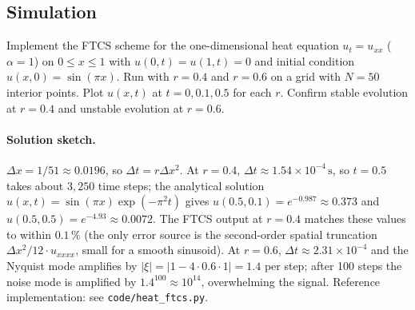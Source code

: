\subsection*{Simulation}

\begin{exercise}
Implement the FTCS scheme for the one-dimensional heat equation
$u_{t} = u_{xx}$ ($\alpha = 1$) on $0 \leq x \leq 1$ with
$u(0, t) = u(1, t) = 0$ and initial condition $u(x, 0) = \sin(\pi
x)$. Run with $r = 0.4$ and $r = 0.6$ on a grid with $N = 50$
interior points. Plot $u(x, t)$ at $t = 0, 0.1, 0.5$ for each
$r$. Confirm stable evolution at $r = 0.4$ and unstable evolution
at $r = 0.6$.

\paragraph{Solution sketch.}
$\Delta x = 1/51 \approx 0.0196$, so $\Delta t = r \Delta x^{2}$.
At $r = 0.4$, $\Delta t \approx 1.54 \times 10^{-4}\,\si{\second}$,
so $t = 0.5$ takes about $3{,}250$ time steps; the analytical
solution $u(x, t) = \sin(\pi x) \exp(-\pi^{2} t)$ gives
$u(0.5, 0.1) = e^{-0.987} \approx 0.373$ and $u(0.5, 0.5) =
e^{-4.93} \approx 0.0072$. The FTCS output at $r = 0.4$ matches
these values to within $0.1\,\%$ (the only error source is the
second-order spatial truncation $\Delta x^{2}/12 \cdot u_{xxxx}$,
small for a smooth sinusoid). At $r = 0.6$, $\Delta t \approx
2.31 \times 10^{-4}$ and the Nyquist mode amplifies by
$|\xi| = |1 - 4 \cdot 0.6 \cdot 1| = 1.4$ per step; after 100
steps the noise mode is amplified by $1.4^{100} \approx 10^{14}$,
overwhelming the signal. Reference implementation: see
\texttt{code/heat\_ftcs.py}.
\end{exercise}

